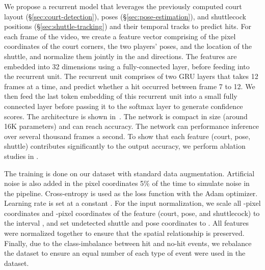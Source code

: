We propose a recurrent model that leverages the previously computed court layout (\S\ref{sec:court-detection}), poses (\S\ref{sec:pose-estimation}), and shuttlecock positions (\S\ref{sec:shuttle-tracking}) and their temporal tracks to predict hits. For each frame of the video, we create a feature vector comprising of the pixel coordinates of the court corners, the two players' poses, and the location of the shuttle, and normalize them jointly in the  and  directions. The features are embedded into 32 dimensions using a fully-connected layer, before feeding into the recurrent unit. The recurrent unit comprises of two GRU layers that takes 12 frames at a time, and predict whether a hit occurred between frame 7 to 12. We then feed the last token embedding of this recurrent unit into a small fully connected layer before passing it to the softmax layer to generate confidence scores. The architecture is shown in~. The network is compact in size (around 16K parameters) and can reach  accuracy. The network can performance inference over several thousand frames a second. To show that each feature (court, pose, shuttle) contributes significantly to the output accuracy, we perform ablation studies in . 

The training is done on our dataset with standard data augmentation. Artificial noise is also added in the pixel coordinates 5\% of the time to simulate noise in the pipeline. Cross-entropy is used as the loss function with the Adam optimizer. Learning rate is set at a constant . For the input normalization, we scale all -pixel coordinates and -pixel coordinates of the feature (court, pose, and shuttlecock) to the interval , and set undetected shuttle and pose coordinates to . All features were normalized together to ensure that the spatial relationship is preserved. Finally, due to the class-imbalance between hit and no-hit events, we rebalance the dataset to ensure an equal number of each type of event were used in the dataset.







